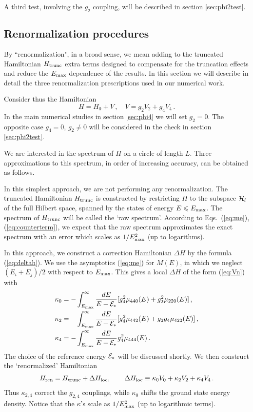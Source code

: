 \documentclass[11pt]{article}
\newcommand{\reef}[1]{(\ref{#1})}
\newcommand{\beq}{\begin{equation}}
\newcommand{\eeq}{\end{equation}}
\def\nn{\nonumber}
\def\calH {{\cal H}}
\def\calE {{\cal E}}
\def\le{\leqslant}
\def \Emax{E_{\rm max}}
\def \Htr{{H_{\rm trunc}}}
\def \Er{{\calE_{\rm *}}}
\numberwithin{equation}{section}
\begin{document}
A third test, involving the $g_2$ coupling, will be described in section \ref{sec:phi2test}.

\subsection{Renormalization procedures}
\label{sec:proc}

By ``renormalization", in a broad sense, we mean adding to the truncated Hamiltonian $\Htr$ extra terms designed to compensate for the truncation effects and reduce the $\Emax$ dependence of the results. In this section we will describe in detail the three renormalization prescriptions used in our numerical work.

Consider thus the Hamiltonian
\beq
\label{eq:g2g4}
H=H_0+V\,,\quad V=g_2 V_2 +g_4 V_4\,.
\eeq
In the main numerical studies in section \ref{sec:phi4} we will set $g_2=0$. The opposite case $g_4=0$, $g_2\ne 0$ will be considered in the check in section \ref{sec:phi2test}.

We are interested in the spectrum of $H$ on a circle of length $L$. Three approximations to this spectrum, in order of increasing accuracy, can be obtained as follows.


\noindent In this simplest approach, we are not performing any renormalization. The truncated Hamiltonian $\Htr$ is constructed by restricting $H$ to the subspace $\calH_l$ of the full Hilbert space, spanned by the states of energy $E\le \Emax$. The spectrum of $\Htr$ will be called the `raw spectrum'. According to Eqs.~\reef{eq:me}, \reef{eq:counterterm}, we expect that the raw spectrum approximates the exact spectrum with an error which scales as $1/\Emax^2$ (up to logarithms). 


\noindent In this approach, we construct a correction Hamiltonian $\Delta H$ by the formula \reef{eq:deltah}. We use the asymptotics 
\reef{eq:me} for $M(E)$, in which we neglect $(E_i+E_j)/2$ with respect to $\Emax$. This gives a local $\Delta H$ of the form \reef{eq:Vn} with 
\begin{align}
\kappa_0&=-\int_{\Emax}^\infty\frac{dE}{E-\Er}[g_4^2 \mu_{440}(E)+ g_2^2 \mu_{220}(E)]\,,\nn\\
\kappa_2&=-\int_{\Emax}^\infty\frac{dE}{E-\Er}[g_4^2 \mu_{442}(E)+ g_2 g_4 \mu_{422}(E)]\,,\label{eq:kappas}\\
\kappa_4&=-\int_{\Emax}^\infty\frac{dE}{E-\Er}g_4^2 \mu_{444}(E)\,.\nn
\end{align}
The choice of the reference energy $\Er$ will be discussed shortly.
We then construct the `renormalized' Hamiltonian
\beq
\label{eq:Hren}
H_{\rm ren}=H_{\rm trunc}+\Delta H_{\rm loc},\qquad \Delta H_{\rm loc}\equiv\kappa_0 V_0+\kappa_2 V_2+ \kappa_4 V_4\,.
\eeq
Thus $\kappa_{2,4}$ correct the $g_{2,4}$ couplings, while $\kappa_0$ shifts the ground state energy density. Notice that the $\kappa$'s scale as $1/\Emax^2$ (up to logarithmic terms). 
\end{document}
